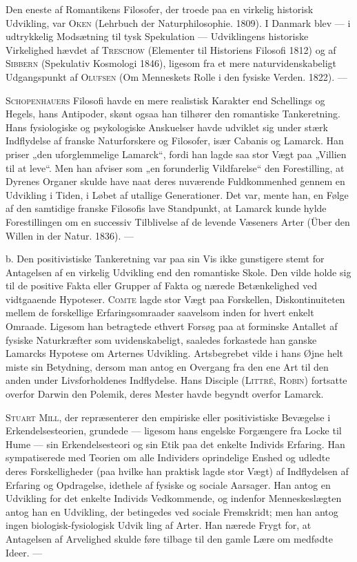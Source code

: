 \documentclass[12pt,a4paper,openany]{book}
\newcommand{\opage}[1]{\marginnote{\footnotesize\textit{[#1]}}}
\begin{document}
Den eneste af Romantikens Filosofer, der troede paa en
virkelig historisk Udvikling, var \textsc{Oken} (Lehrbuch der Naturphilosophie.
1809). I Danmark blev --- i udtrykkelig Modsætning
til tysk Spekulation --- Udviklingens historiske Virkelighed
hævdet af \textsc{Treschow} (Elementer til Historiens Filosofi 1812)
og af \textsc{Sibbern} (Spekulativ Kosmologi 1846), ligesom fra et
mere naturvidenskabeligt Udgangspunkt af \textsc{Olufsen} (Om Menneskets
Rolle i den fysiske Verden. 1822). ---

\textsc{Schopenhauers} Filosofi havde en mere realistisk Karakter
end Schellings og Hegels, hans Antipoder, skønt ogsaa
han tilhører den romantiske Tankeretning. Hans fysiologiske
\setcounter{footnote}{0}%
\opage{207}og psykologiske Anskuelser havde udviklet sig under stærk
Indflydelse af franske Naturforskere og Filosofer, især Cabanis
og Lamarck. Han priser „den uforglemmelige Lamarck“, fordi
han lagde saa stor Vægt paa „Villien til at leve“. Men han
afviser som „en forunderlig Vildfarelse“ den Forestilling, at
Dyrenes Organer skulde have naat deres nuværende Fuldkommenhed
gennem en Udvikling i Tiden, i Løbet af utallige
Generationer. Det var, mente han, en Følge af den samtidige
franske Filosofis lave Standpunkt, at Lamarck kunde hylde Forestillingen
om en successiv Tilblivelse af de levende Væseners
Arter (Über den Willen in der Natur. 1836). ---

b. Den positivistiske Tankeretning var paa sin Vis ikke
gunstigere stemt for Antagelsen af en virkelig Udvikling end
den romantiske Skole. Den vilde holde sig til de positive
Fakta eller Grupper af Fakta og nærede Betænkelighed ved
vidtgaaende Hypoteser. \textsc{Comte} lagde stor Vægt paa Forskellen,
Diskontinuiteten mellem de forskellige Erfaringsomraader saavelsom
inden for hvert enkelt Omraade. Ligesom han betragtede
ethvert Forsøg paa at forminske Antallet af fysiske Naturkræfter
som uvidenskabeligt, saaledes forkastede han ganske
Lamarcks Hypotese om Arternes Udvikling. Artsbegrebet vilde
i hans Øjne helt miste sin Betydning, dersom man antog en
Overgang fra den ene Art til den anden under Livsforholdenes
Indflydelse. Hans Disciple (\textsc{Littré}, \textsc{Robin}) fortsatte overfor
Darwin den Polemik, deres Mester havde begyndt overfor
Lamarck.

\textsc{Stuart Mill}, der repræsenterer den empiriske eller positivistiske
Bevægelse i Erkendelsesteorien, grundede --- ligesom
hans engelske Forgængere fra Locke til Hume --- sin Erkendelsesteori
og sin Etik paa det enkelte Individs Erfaring. Han sympatiserede
med Teorien om alle Individers oprindelige Enshed
og udledte deres Forskelligheder (paa hvilke han praktisk lagde
stor Vægt) af Indflydelsen af Erfaring og Opdragelse, idethele
af fysiske og sociale Aarsager. Han antog en Udvikling for
det enkelte Individs Vedkommende, og indenfor Menneskeslægten
antog han en Udvikling, der betingedes ved sociale
Fremskridt; men han antog ingen biologisk-fysiologisk Udvik%
\setcounter{footnote}{0}%
\opage{208}ling af Arter. Han nærede Frygt for, at Antagelsen af Arvelighed
skulde føre tilbage til den gamle Lære om medfødte
Ideer. ---
\end{document}
